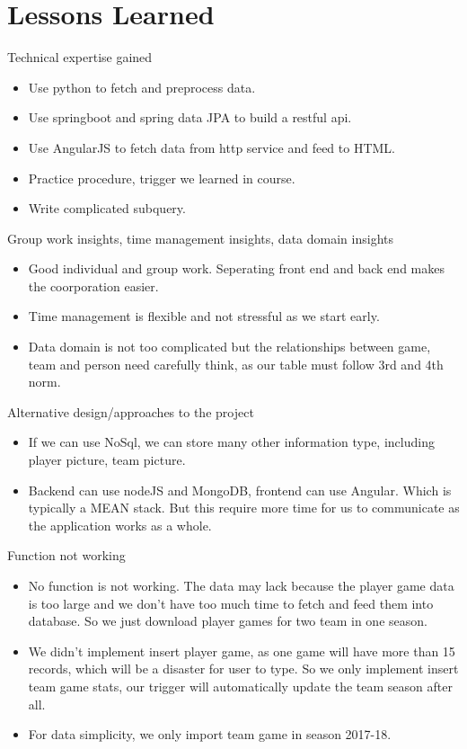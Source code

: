 \documentclass[a4paper,12pt]{article} %
\begin{document}
\section{Lessons Learned}
Technical expertise gained
\begin{itemize}
    \item Use python to fetch and preprocess data.
    \item Use springboot and spring data JPA to build a restful api.
    \item Use AngularJS to fetch data from http service and feed to HTML.
    \item Practice procedure, trigger we learned in course.
    \item Write complicated subquery.
\end{itemize}
Group work insights, time management insights, data domain insights
\begin{itemize}
    \item Good individual and group work. Seperating front end and back end makes the coorporation easier.
    \item Time management is flexible and not stressful as we start early.
    \item Data domain is not too complicated but the relationships between game, team and person need carefully think,
    as our table must follow 3rd and 4th norm.
\end{itemize}
Alternative design/approaches to the project
\begin{itemize}
    \item If we can use NoSql, we can store many other information type, including player picture, team picture. 
    \item Backend can use nodeJS and MongoDB, frontend can use Angular. Which is typically a MEAN stack. But this
    require more time for us to communicate as the application works as a whole.
\end{itemize}
Function not working
\begin{itemize}
    \item No function is not working. The data may lack because the player game data is too large and we don't have too much time
    to fetch and feed them into database. So we just download player games for two team in one season.
    \item We didn't implement insert player game, as one game will have more than 15 records, which will be a disaster for user 
    to type. So we only implement insert team game stats, our trigger will automatically update the team season after all.
    \item For data simplicity, we only import team game in season 2017-18.
\end{itemize}
\end{document}
